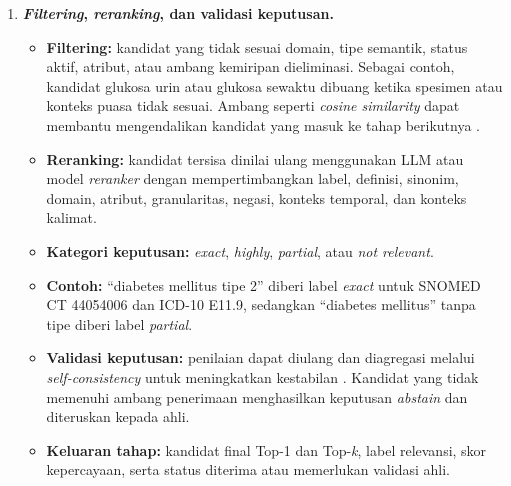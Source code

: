 \begin{enumerate}
    \item \textbf{\textit{Filtering}, \textit{reranking}, dan validasi keputusan.}
    \begin{itemize}
        \item \textbf{Filtering:} kandidat yang tidak sesuai domain, tipe semantik, status aktif, atribut, atau ambang kemiripan dieliminasi. Sebagai contoh, kandidat glukosa urin atau glukosa sewaktu dibuang ketika spesimen atau konteks puasa tidak sesuai. Ambang seperti \textit{cosine similarity} dapat membantu mengendalikan kandidat yang masuk ke tahap berikutnya \citep{chen_clinical_2020}.
        \item \textbf{Reranking:} kandidat tersisa dinilai ulang menggunakan LLM atau model \textit{reranker} dengan mempertimbangkan label, definisi, sinonim, domain, atribut, granularitas, negasi, konteks temporal, dan konteks kalimat.
        \item \textbf{Kategori keputusan:} \textit{exact}, \textit{highly}, \textit{partial}, atau \textit{not relevant}.
        \item \textbf{Contoh:} ``diabetes mellitus tipe 2'' diberi label \textit{exact} untuk SNOMED CT 44054006 dan ICD-10 E11.9, sedangkan ``diabetes mellitus'' tanpa tipe diberi label \textit{partial}.
        \item \textbf{Validasi keputusan:} penilaian dapat diulang dan diagregasi melalui \textit{self-consistency} untuk meningkatkan kestabilan \citep{wang_self-consistency_2023,gilani_cde-mapper_2025}. Kandidat yang tidak memenuhi ambang penerimaan menghasilkan keputusan \textit{abstain} dan diteruskan kepada ahli.
        \item \textbf{Keluaran tahap:} kandidat final Top-1 dan Top-\textit{k}, label relevansi, skor kepercayaan, serta status diterima atau memerlukan validasi ahli.
    \end{itemize}


\end{enumerate}
